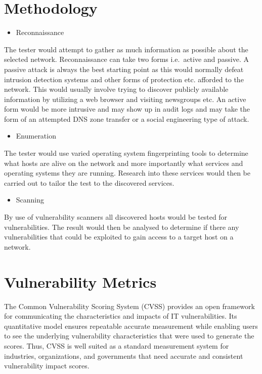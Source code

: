 

  \section{Methodology}\label{methodology-utilized}

  \begin{itemize}
  \tightlist \item Reconnaissance
  \end{itemize}

  The tester would attempt to gather as much information as possible about
  the selected network. Reconnaissance can take two forms i.e.~active and
  passive. A passive attack is always the best starting point as this
  would normally defeat intrusion detection systems and other forms of
  protection etc. afforded to the network. This would usually involve
  trying to discover publicly available information by utilizing a web
  browser and visiting newsgroups etc. An active form would be more
  intrusive and may show up in audit logs and may take the form of an
  attempted DNS zone transfer or a social engineering type of attack.

  \begin{itemize}
  \tightlist \item Enumeration
  \end{itemize}

  The tester would use varied operating system fingerprinting tools to
  determine what hosts are alive on the network and more importantly what
  services and operating systems they are running. Research into these
  services would then be carried out to tailor the test to the discovered
  services.

  \begin{itemize}
  \tightlist \item Scanning
  \end{itemize}

  By use of vulnerability scanners all discovered hosts would be tested
  for vulnerabilities. The result would then be analysed to determine if
  there any vulnerabilities that could be exploited to gain access to a
  target host on a network.

  \section{Vulnerability Metrics}\label{vulnerability-metrics}

  The Common Vulnerability Scoring System (CVSS) provides an open
  framework for communicating the characteristics and impacts of IT
  vulnerabilities. Its quantitative model ensures repeatable accurate
  measurement while enabling users to see the underlying vulnerability
  characteristics that were used to generate the scores. Thus, CVSS is
  well suited as a standard measurement system for industries,
  organizations, and governments that need accurate and consistent
  vulnerability impact scores.

